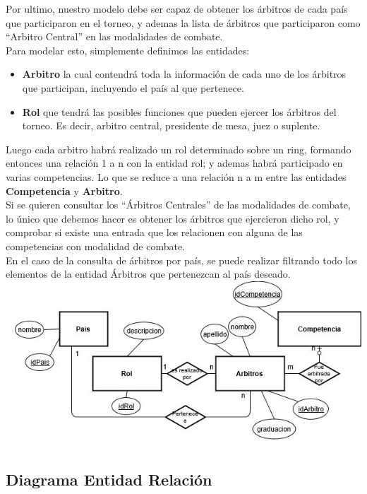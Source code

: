 Por ultimo, nuestro modelo debe ser capaz de obtener los árbitros de cada país que participaron en el torneo, y ademas la lista de árbitros que participaron como ``Arbitro Central'' en las modalidades de combate.\\

Para modelar esto, simplemente definimos las entidades: 
\begin{itemize}
\item \textbf{Arbitro} la cual contendrá toda la información de cada uno de los árbitros que participan, incluyendo el país al que pertenece.
\item \textbf{Rol} que tendrá las posibles funciones que pueden ejercer los árbitros del torneo. Es decir, arbitro central, presidente de mesa, juez o suplente.
\end{itemize}
Luego cada arbitro habrá realizado un rol determinado sobre un ring, formando entonces una relación 1 a n con la entidad rol; y ademas habr\'a participado en varias competencias. Lo que se reduce a una relación n a m entre las entidades \textbf{Competencia} y \textbf{Arbitro}.\\

Si se quieren consultar los ``Árbitros Centrales'' de las modalidades de combate, lo único que debemos hacer es obtener los árbitros que ejercieron dicho rol, y comprobar si existe una entrada que los relacionen con alguna de las competencias con modalidad de combate.\\

En el caso de la consulta de árbitros por país, se puede realizar filtrando todo los elementos de la entidad Árbitros que pertenezcan al país deseado. \\

\includegraphics[scale=0.75]{arbitroDiag.jpg}

\subsection{Diagrama Entidad Relaci\'on}

